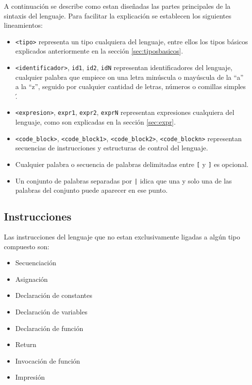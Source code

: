 \documentclass[12pt, spanish]{report}
\begin{document}
A continuaci\'on se describe como estan dise\~nadas las partes principales
de la sintaxis del lenguaje. Para facilitar la explicaci\'on se
establecen los siguientes lineamientos:

\begin{itemize}
\item \texttt{<tipo>} representa un tipo cualquiera del lenguaje, entre ellos
 los tipos b\'asicos explicados anteriormente en la secci\'on
 \ref{sec:tiposbasicos}.

\item \texttt{<identificador>}, \texttt{id1}, \texttt{id2},
 \texttt{idN} representan identificadores del lenguaje, cualquier
 palabra que empiece on una letra min\'uscula o may\'uscula de la ``a'' a
 la ``z'', seguido por cualquier cantidad de letras, n\'umeros o
 comillas simples \'.

\item \texttt{<expresion>}, \texttt{expr1}, \texttt{expr2},
 \texttt{exprN} representan expresiones cualquiera del lenguaje, como
 son explicadas en la secci\'on \ref{sec:expr}.

\item \texttt{<code_block>}, \texttt{<code_block1>}, \texttt{<code_block2>},
      \texttt{<code_blockn>} representan secuencias de instrucciones y
      estructuras de control del lenguaje.

\item Cualquier palabra o secuencia de palabras delimitadas entre
 \texttt{[} y \texttt{]} es opcional.

\item Un conjunto de palabras separadas por \texttt{|} idica que una y
solo una de las palabras del conjunto puede aparecer en ese punto.
\end{itemize}

\subsection{Instrucciones}
Las instrucciones del lenguaje que no estan exclusivamente
ligadas a alg\'un tipo compuesto son:
\begin{itemize}
\item Secuenciaci\'on
\item Asignaci\'on
\item Declaraci\'on de constantes
\item Declaraci\'on de variables
\item Declaraci\'on de funci\'on
\item Return
\item Invocaci\'on de funci\'on
\item Impresi\'on
\end{itemize}
\end{document}
